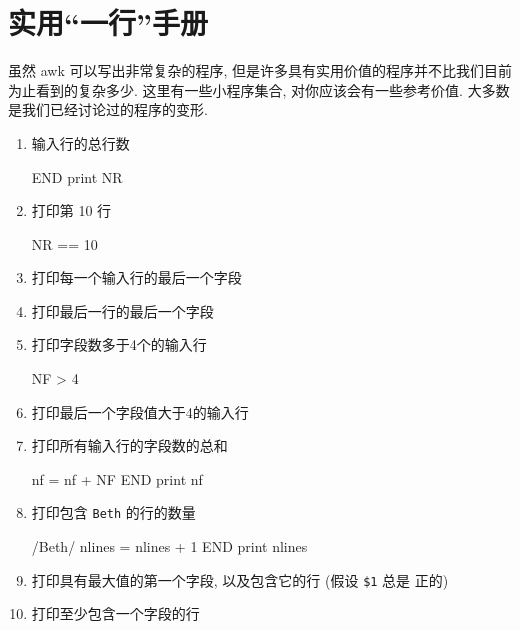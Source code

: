 \section{实用``一行''手册}
\label{sec:a_handful_of_useful_one_liners}

虽然 awk 可以写出非常复杂的程序, 但是许多具有实用价值的程序并不比我们目前
为止看到的复杂多少. 这里有一些小程序集合, 对你应该会有一些参考价值. 大多数
是我们已经讨论过的程序的变形.
\begin{enumerate}
\item 输入行的总行数
\begin{myverb}
    END { print NR }
\end{myverb}
\item 打印第 10 行
\begin{myverb}
    NR == 10
\end{myverb}
\item 打印每一个输入行的最后一个字段
\item 打印最后一行的最后一个字段
\item 打印字段数多于4个的输入行
\begin{myverb}
    NF > 4
\end{myverb}
\item 打印最后一个字段值大于4的输入行
\item 打印所有输入行的字段数的总和
\begin{myverb}
    { nf = nf + NF }
    END { print nf }
\end{myverb}
\item 打印包含 \texttt{Beth} 的行的数量
\begin{myverb}
    /Beth/ { nlines = nlines + 1 }
    END { print nlines }
\end{myverb}
\item 打印具有最大值的第一个字段, 以及包含它的行 (假设 \verb'$1' 总是
    正的)
\item 打印至少包含一个字段的行
\begin{myverb}

\end{myverb}
\end{enumerate}
